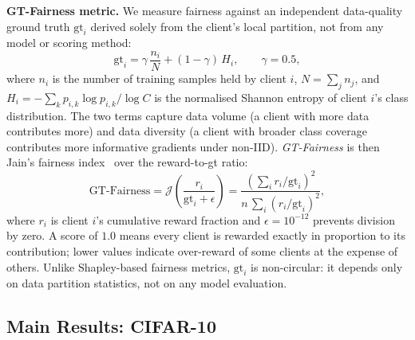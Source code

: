 \documentclass[journal]{IEEEtran}
\theoremstyle{definition}
\theoremstyle{remark}
\begin{document}
\textbf{GT-Fairness metric.}
\label{subsec:gt_fairness}
We measure fairness against an independent data-quality ground truth
$\mathrm{gt}_i$ derived solely from the client's local partition,
not from any model or scoring method:
\begin{equation}
  \mathrm{gt}_i = \gamma\,\frac{n_i}{N} + (1{-}\gamma)\,H_i,
  \qquad \gamma = 0.5,
  \label{eq:gt}
\end{equation}
where $n_i$ is the number of training samples held by client $i$,
$N = \sum_j n_j$, and $H_i = -\sum_k p_{i,k}\log p_{i,k} /
\log C$ is the normalised Shannon entropy of client $i$'s class
distribution.
The two terms capture data volume (a client with more data
contributes more) and data diversity (a client with broader class
coverage contributes more informative gradients under non-IID).
\emph{GT-Fairness} is then Jain's fairness index~\cite{jain1984fair}
over the reward-to-gt ratio:
\begin{equation}
  \mathrm{GT\text{-}Fairness} = \mathcal{J}\!\left(\frac{r_i}{\mathrm{gt}_i + \epsilon}\right)
  = \frac{\left(\sum_i r_i/\mathrm{gt}_i\right)^2}
         {n\,\sum_i (r_i/\mathrm{gt}_i)^2},
  \label{eq:gtfairness}
\end{equation}
where $r_i$ is client $i$'s cumulative reward fraction and
$\epsilon{=}10^{-12}$ prevents division by zero.
A score of $1.0$ means every client is rewarded exactly in
proportion to its contribution; lower values indicate
over-reward of some clients at the expense of others.
Unlike Shapley-based fairness metrics, $\mathrm{gt}_i$ is
non-circular: it depends only on data partition statistics,
not on any model evaluation.

\subsection{Main Results: CIFAR-10}
\end{document}

